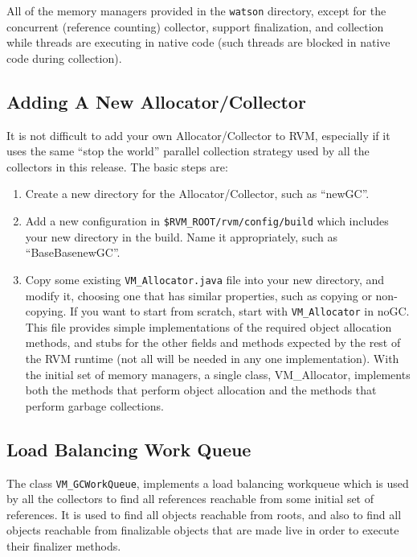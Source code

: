All of the memory managers provided in the {\tt watson} directory,
except for the concurrent (reference counting) collector, support
finalization, and collection while threads are executing in 
native code (such threads are blocked in native code during collection).

\subsection{Adding A New Allocator/Collector} \label{sssec:newalloc}
It is not difficult to add your own Allocator/Collector to RVM,
especially if it uses the same ``stop the world'' parallel collection
strategy used by all the collectors in this release.  The basic steps
are:
\begin{enumerate}
\item Create a new directory for the Allocator/Collector, such as ``newGC''.
\item Add a new configuration in {\tt \$RVM\_ROOT/rvm/config/build}
which includes your new directory in the build.  Name it appropriately, such as
``BaseBasenewGC''.
\item Copy some existing {\tt VM\_Allocator.java} file into your new directory,
and modify it, choosing one that has similar properties, such as copying or
non-copying.  If you want to start from scratch, start with 
{\tt VM\_Allocator} in noGC.
This file provides simple implementations of the required object allocation
methods, and stubs for the other fields and methods expected by the rest
of the RVM runtime (not all will be needed in any one implementation).
With the initial set of memory managers, a single class, VM\_Allocator, implements both
the methods that perform object allocation and the methods that perform
garbage collections.
\end{enumerate}

\subsection{Load Balancing Work Queue} \label{sssec:workqueue}
The class {\tt VM\_GCWorkQueue}, implements a load balancing workqueue
which is used by all the collectors to find all references reachable from
some initial set of references.  It is used to find all objects reachable
from roots, and also to find all objects reachable from finalizable objects
that are made live in order to execute their finalizer methods.

